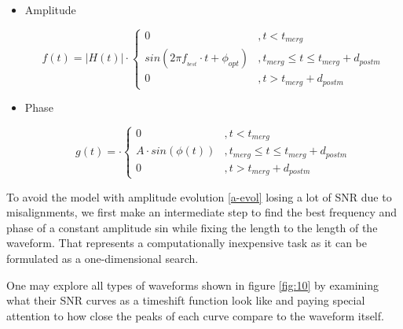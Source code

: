 \begin{itemize}

\item Amplitude


\begin{equation}\label{a-evol}
f(t) = |H(t)| \cdot \begin{cases} 
      0 &, t< t_{merg} \\
      sin(2\pi f_{_{best}}\cdot t + \phi_{opt}) &, t_{merg} \leq t \leq t_{merg} + d_{postm} \\
      0 &, t> t_{merg} + d_{postm}
   \end{cases}
\end{equation}

\item Phase

\begin{equation}\label{pha-evol}
g(t) = \cdot \begin{cases} 
      0 &, t< t_{merg} \\
      A \cdot sin(\phi(t)) &, t_{merg} \leq t \leq t_{merg} + d_{postm} \\
      0 &, t> t_{merg} + d_{postm}
   \end{cases}
\end{equation}

\end{itemize}

To avoid the model with amplitude evolution \ref{a-evol} losing a lot of SNR due to misalignments, we first make an intermediate step to find the best frequency and phase of a constant amplitude sin while fixing the length to the length of the waveform. That represents a computationally inexpensive task as it can be formulated as a one-dimensional search.


One may explore all types of waveforms shown in figure \ref{fig:10} by examining what their SNR curves as a timeshift function look like and paying special attention to how close the peaks of each curve compare to the waveform itself.

